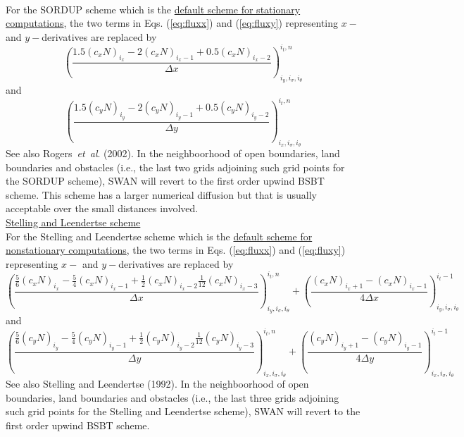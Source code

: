 \documentclass[12pt]{book}
\begin{document}
\\[2ex]
\noindent
For the SORDUP scheme which is the \underline{default scheme for stationary computations}, the two terms in
Eqs. (\ref{eq:fluxx}) and (\ref{eq:fluxy}) representing $x-$ and $y-$derivatives are replaced by
\begin{equation}
  \left( \frac{1.5 (c_x N)_{i_x} - 2 (c_x N)_{i_x-1} + 0.5 (c_x N)_{i_x-2}}{\Delta x} \right)^{i_t,n}_{i_y, i_{\sigma}, i_{\theta}}
\end{equation}
and
\begin{equation}
  \left( \frac{1.5 (c_y N)_{i_y} - 2 (c_y N)_{i_y-1} + 0.5 (c_y N)_{i_y-2}}{\Delta y} \right)^{i_t,n}_{i_x, i_{\sigma}, i_{\theta}}
\end{equation}
See also Rogers~{\it et~al}. (2002).
In the neighboorhood of open boundaries, land boundaries and obstacles (i.e., the last two grids adjoining such grid points for
the SORDUP scheme), SWAN will revert to the first order upwind BSBT scheme. This scheme has a larger numerical diffusion but that
is usually acceptable over the small distances involved.
\\[2ex]
\noindent
\underline{Stelling and Leendertse scheme}
\\[2ex]
\noindent
For the Stelling and Leendertse scheme which is the \underline{default scheme for nonstationary computations}, the two terms in
Eqs. (\ref{eq:fluxx}) and (\ref{eq:fluxy}) representing $x-$ and $y-$derivatives are replaced by
\begin{equation}
  \left( \frac{\frac{5}{6} (c_x N)_{i_x} - \frac{5}{4} (c_x N)_{i_x-1} + \frac{1}{2} (c_x N)_{i_x-2} \frac{1}{12} (c_x N)_{i_x-3}}{\Delta x} \right)^{i_t,n}_{i_y, i_{\sigma}, i_{\theta}}
  + \left( \frac{(c_x N)_{i_x+1} - (c_x N)_{i_x-1}}{4 \Delta x} \right)^{i_t-1}_{i_y, i_{\sigma}, i_{\theta}}
\end{equation}
and
\begin{equation}
  \left( \frac{\frac{5}{6} (c_y N)_{i_y} - \frac{5}{4} (c_y N)_{i_y-1} + \frac{1}{2} (c_y N)_{i_y-2} \frac{1}{12} (c_y N)_{i_y-3}}{\Delta y} \right)^{i_t,n}_{i_x, i_{\sigma}, i_{\theta}}
  + \left( \frac{(c_y N)_{i_y+1} - (c_y N)_{i_y-1}}{4 \Delta y} \right)^{i_t-1}_{i_x, i_{\sigma}, i_{\theta}}
\end{equation}
See also Stelling and Leendertse (1992).
In the neighboorhood of open boundaries, land boundaries and obstacles (i.e., the last three grids adjoining such grid points for
the Stelling and Leendertse scheme), SWAN will revert to the first order upwind BSBT scheme.
\\[2ex]
\end{document}

